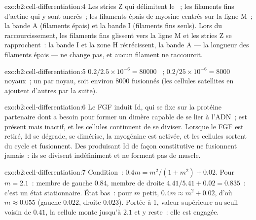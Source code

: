 \begin{solution}{exo:b2:cell-differentiation:4}
Les stries Z qui délimitent le ~; les filaments fins d'actine
qui y sont ancrés~; les filaments épais de myosine centrés sur la ligne
M~; la bande A (filaments épais) et la bande I (filaments fins seuls).
Lors du raccourcissement, les filaments fins glissent vers la ligne M et
les stries Z se rapprochent~: la bande I et la zone H rétrécissent, la
bande A --- la longueur des filaments épais --- ne change pas, et aucun
filament ne raccourcit.
\end{solution}

\begin{solution}{exo:b2:cell-differentiation:5}
$0.2/2.5\times 10^{-6} = \num{80000}$ ~; $0.2/25\times 10^{-6}
= \num{8000}$ noyaux~; un  par noyau, soit environ \num{8000}
 fusionnés (les cellules satellites en ajoutent d'autres par
la suite).
\end{solution}

\begin{solution}{exo:b2:cell-differentiation:6}
Le FGF induit Id, qui se fixe sur la protéine partenaire dont  a
besoin pour former un dimère capable de se lier à l'ADN~;  est
présent mais inactif, et les cellules continuent de se diviser. Lorsque
le FGF est retiré, Id se dégrade,  se dimérise, la myogénine est
activée, et les cellules sortent du cycle et fusionnent. Des 
produisant Id de façon constitutive ne fusionnent jamais~: ils se
divisent indéfiniment et ne forment pas de muscle.
\end{solution}

\begin{solution}{exo:b2:cell-differentiation:7}
Condition~: $0.4m = m^{2}/(1 + m^{2}) + 0.02$. Pour $m = 2.1$~: membre
de gauche $0.84$, membre de droite $4.41/5.41 + 0.02 = 0.835$~: c'est un
état stationnaire. État bas~: pour $m$ petit, $0.4m \approx m^{2} + 0.02$,
d'où $m \approx
0.055$ (gauche $0.022$, droite $0.023$). Portée à 1, valeur supérieure
au seuil voisin de $0.41$, la cellule monte jusqu'à $2.1$ et y reste~:
elle est engagée.
\end{solution}


